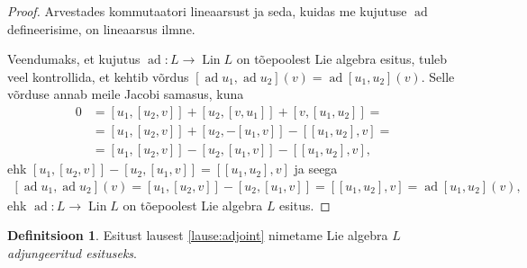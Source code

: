 \documentclass[12pt]{article}
\theoremstyle{plain}
\theoremstyle{definition}
\newtheorem{definitsioon}{Definitsioon}[section]
\numberwithin{equation}{section}
\DeclareMathOperator{\ad}{ad}
\DeclareMathOperator{\Lin}{Lin}
\begin{document}
\begin{proof}
Arvestades kommutaatori lineaarsust ja seda, kuidas me kujutuse 
$\ad$ defineerisime, on lineaarsus ilmne.

Veendumaks, et kujutus $\ad : L \rightarrow \Lin L$ on tõepoolest 
Lie algebra esitus, tuleb veel kontrollida, et kehtib võrdus 
$\left[\ad u_1, \ad u_2 \right] \left(v\right) = 
\ad \left[u_1, u_2 \right] \left(v\right)$. Selle võrduse 
annab meile Jacobi samasus, kuna
\begin{align*}
0 &= \left[ u_1, \left[u_2, v\right] \right] + \left[ u_2, 
	\left[v, u_1 \right] \right] + 
	\left[ v, \left[u_1, u_2\right] \right] = \\
&= \left[ u_1, \left[u_2, v\right] \right] + 
	\left[ u_2, -\left[u_1, v \right] \right] - 
	\left[\left[u_1, u_2\right], v\right] = \\
&= \left[ u_1, \left[u_2, v\right] \right] - 
	\left[ u_2, \left[u_1, v \right] \right] - 
	\left[\left[u_1, u_2\right], v\right],
\end{align*}
ehk $\left[ u_1, \left[u_2, v\right] \right] - 
	\left[ u_2, \left[u_1, v \right] \right] = 
	\left[\left[u_1, u_2\right], v\right]$ ja seega
\begin{align*}
\left[\ad u_1, \ad u_2 \right] \left(v\right) = 
	\left[u_1, \left[u_2, v\right]\right ] - 
	\left[u_2, \left[u_1, v\right]\right] = 
	\left[\left[u_1, u_2\right], v\right] = 
	\ad \left[u_1, u_2 \right] \left(v\right),
\end{align*}
ehk $\ad : L \rightarrow \Lin L$ on tõepoolest Lie algebra $L$ 
esitus.
\end{proof}

\begin{definitsioon}
Esitust lausest \ref{lause:adjoint} nimetame Lie algebra $L$ 
\emph{adjungeeritud esituseks}.
\end{definitsioon}
\end{document}
